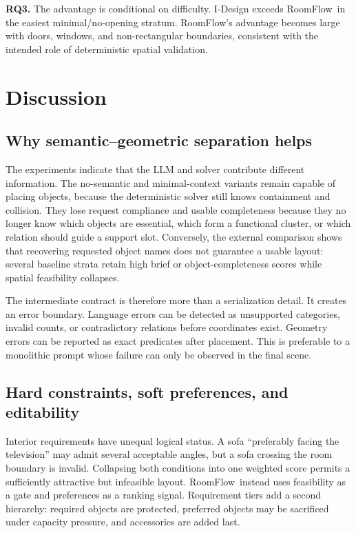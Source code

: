\documentclass[pdflatex,sn-mathphys-num]{sn-jnl}
\newcommand{\method}{RoomFlow}
\begin{document}
\textbf{RQ3.} The advantage is conditional on difficulty. I-Design exceeds \method\ in the easiest minimal/no-opening stratum. \method's advantage becomes large with doors, windows, and non-rectangular boundaries, consistent with the intended role of deterministic spatial validation.

\section{Discussion}\label{sec:discussion}

\subsection{Why semantic--geometric separation helps}

The experiments indicate that the LLM and solver contribute different information. The no-semantic and minimal-context variants remain capable of placing objects, because the deterministic solver still knows containment and collision. They lose request compliance and usable completeness because they no longer know which objects are essential, which form a functional cluster, or which relation should guide a support slot. Conversely, the external comparison shows that recovering requested object names does not guarantee a usable layout: several baseline strata retain high brief or object-completeness scores while spatial feasibility collapses.

The intermediate contract is therefore more than a serialization detail. It creates an error boundary. Language errors can be detected as unsupported categories, invalid counts, or contradictory relations before coordinates exist. Geometry errors can be reported as exact predicates after placement. This is preferable to a monolithic prompt whose failure can only be observed in the final scene.

\subsection{Hard constraints, soft preferences, and editability}

Interior requirements have unequal logical status. A sofa ``preferably facing the television'' may admit several acceptable angles, but a sofa crossing the room boundary is invalid. Collapsing both conditions into one weighted score permits a sufficiently attractive but infeasible layout. \method\ instead uses feasibility as a gate and preferences as a ranking signal. Requirement tiers add a second hierarchy: required objects are protected, preferred objects may be sacrificed under capacity pressure, and accessories are added last.
\end{document}
